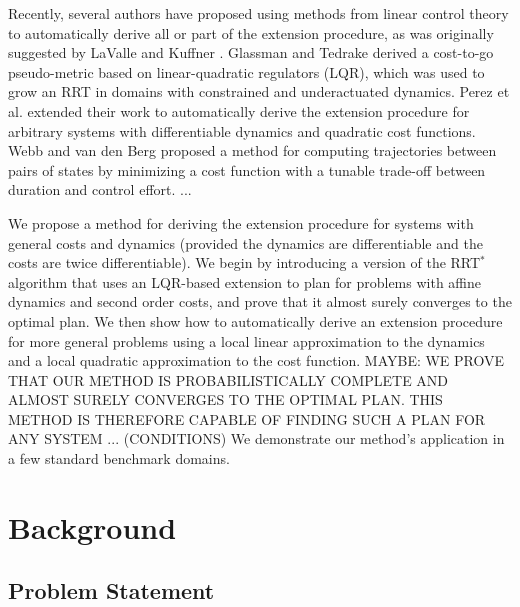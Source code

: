\documentclass[letterpaper, 10pt, english, conference]{IEEEtran}
\begin{document}
Recently, several authors have proposed using methods from linear
control theory to automatically derive all or part of the extension
procedure, as was originally suggested by LaValle and Kuffner
\cite{lavalle.kuffner.ijrr01}. Glassman and Tedrake \cite{elena.russ.icra10}
derived a cost-to-go pseudo-metric based on linear-quadratic regulators (LQR),
which was used to grow an RRT in domains with constrained and 
underactuated dynamics. Perez et al. \cite{Perez12} extended their work
to automatically derive the extension procedure for arbitrary systems
with differentiable dynamics and quadratic cost functions. Webb and van den Berg \cite{jur} proposed a method for computing trajectories between pairs of states by minimizing a cost function with a tunable trade-off between duration and control effort. ...

We propose a method for deriving the extension procedure for systems
with general costs and dynamics (provided the dynamics are differentiable
and the costs are twice differentiable). We begin by introducing a 
version of the RRT$^*$ algorithm that uses an LQR-based
extension to plan for problems with affine dynamics and second order costs,
and prove that it almost surely converges to the optimal plan.  
We then show how to automatically derive an
extension procedure for more general problems using
a local linear approximation to the dynamics and a local quadratic
approximation to the cost function. 
MAYBE: WE PROVE THAT OUR METHOD IS PROBABILISTICALLY COMPLETE AND
ALMOST SURELY CONVERGES TO THE OPTIMAL PLAN. THIS METHOD IS
THEREFORE CAPABLE OF FINDING SUCH A PLAN FOR ANY SYSTEM ... (CONDITIONS)
We demonstrate
our method's application in a few standard benchmark domains. 

%



\section{Background}

\subsection{Problem Statement}
\end{document}
